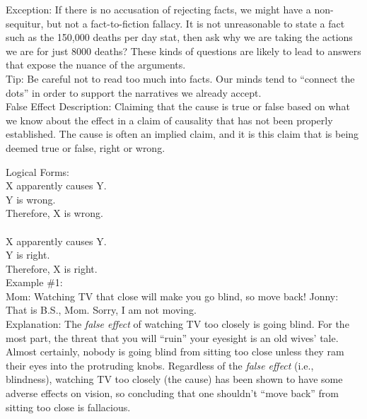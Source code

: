 \documentclass[a4paper,12pt,single,pdftex]{scrbook}
\begin{document}
    
      Exception: If there is no accusation of rejecting facts, we might have a non-sequitur, but not a fact-to-fiction fallacy. It is not unreasonable to state a fact such as the 150,000 deaths per day stat, then ask why we are taking the actions we are for just 8000 deaths? These kinds of questions are likely to lead to answers that expose the nuance of the arguments.
    \\

    
      Tip: Be careful not to read too much into facts. Our minds tend to “connect the dots” in order to support the narratives we already accept.
    \\

  

False Effect
    Description: Claiming that the cause is true or false based on what we know about the effect in a claim of causality that has not been properly established. The cause is often an implied claim, and it is this claim that is being deemed true or false, right or wrong.

    
      Logical Forms:
    \\

    
      X apparently causes Y.
    \\

    
      Y is wrong.
    \\

    
      Therefore, X is wrong.
    \\

    
       
    \\

    
      X apparently causes Y.
    \\

    
      Y is right.
    \\

    
      Therefore, X is right.
    \\

    
      Example \#1:
    \\

    
      Mom: Watching TV that close will make you go blind, so move back! \newline
Jonny: That is B.S., Mom. Sorry, I am not moving.
    \\

    
      Explanation: The {\em false effect} of watching TV too closely is going blind. For the most part, the threat that you will “ruin” your eyesight is an old wives’ tale. Almost certainly, nobody is going blind from sitting too close unless they ram their eyes into the protruding knobs. Regardless of the {\em false effect} (i.e., blindness), watching TV too closely (the cause) has been shown to have some adverse effects on vision, so concluding that one shouldn’t “move back” from sitting too close is fallacious.
    \\
\end{document}
